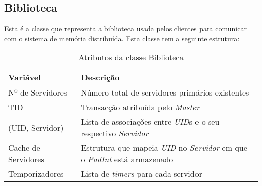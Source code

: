 \subsection{Biblioteca}
Esta é a classe que representa a biblioteca usada pelos clientes para comunicar com o sistema de memória distribuída. Esta classe tem a seguinte estrutura:

\begin{table}[H]
\centering
\begin{tabular}{| p{2cm} | p{} |}
\hline
\textbf{Variável} & \textbf{Descrição} \\
\hline
Nº de Servidores & Número total de servidores primários existentes  \\
\hline
TID & Transacção atribuída pelo \textit{Master} \\
\hline
(UID, Servidor) & Lista de associações entre \textit{UID}s e o seu respectivo \textit{Servidor} \\
\hline
Cache de Servidores & Estrutura que mapeia \textit{UID} no \textit{Servidor} em que o \textit{PadInt} está armazenado \\
\hline
Temporizadores & Lista de \textit{timers} para cada servidor \\
\hline
\end{tabular}
\caption{Atributos da classe Biblioteca} \label{lib}
\end{table}

